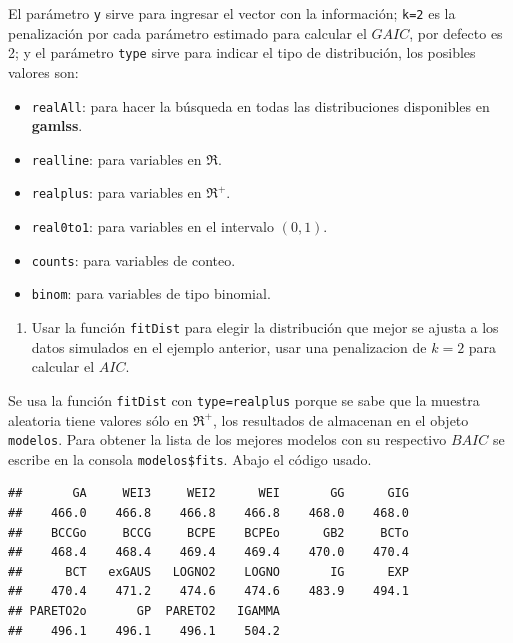 \documentclass[10pt,]{krantz}
\makeatletter
\newenvironment{Shaded}{\begin{snugshade}}{\end{snugshade}}
\newcommand{\KeywordTok}[1]{\textcolor[rgb]{0.13,0.29,0.53}{\textbf{#1}}}
\newcommand{\DataTypeTok}[1]{\textcolor[rgb]{0.13,0.29,0.53}{#1}}
\newcommand{\DecValTok}[1]{\textcolor[rgb]{0.00,0.00,0.81}{#1}}
\newcommand{\StringTok}[1]{\textcolor[rgb]{0.31,0.60,0.02}{#1}}
\newcommand{\OperatorTok}[1]{\textcolor[rgb]{0.81,0.36,0.00}{\textbf{#1}}}
\newcommand{\NormalTok}[1]{#1}
\providecommand{\tightlist}{%
  \setlength{\itemsep}{0pt}\setlength{\parskip}{0pt}}
\newenvironment{kframe}{%
\medskip{}
\setlength{\fboxsep}{.8em}
 \def\at@end@of@kframe{}%
 \ifinner\ifhmode%
  \def\at@end@of@kframe{\end{minipage}}%
  \begin{minipage}{\columnwidth}%
 \fi\fi%
 \def\FrameCommand##1{\hskip\@totalleftmargin \hskip-\fboxsep
 \colorbox{shadecolor}{##1}\hskip-\fboxsep
     \hskip-\linewidth \hskip-\@totalleftmargin \hskip\columnwidth}%
 \MakeFramed {\advance\hsize-\width
   \@totalleftmargin\z@ \linewidth\hsize
   \@setminipage}}%
 {\par\unskip\endMakeFramed%
 \at@end@of@kframe}
\renewenvironment{Shaded}{\begin{kframe}}{\end{kframe}}
\makeatother
\begin{document}
El parámetro \texttt{y} sirve para ingresar el vector con la
información; \texttt{k=2} es la penalización por cada parámetro estimado
para calcular el \(GAIC\), por defecto es 2; y el parámetro
\texttt{type} sirve para indicar el tipo de distribución, los posibles
valores son:

\begin{itemize}
\tightlist
\item
  \texttt{realAll}: para hacer la búsqueda en todas las distribuciones
  disponibles en \textbf{gamlss}.
\item
  \texttt{realline}: para variables en \(\Re\).
\item
  \texttt{realplus}: para variables en \(\Re^+\).
\item
  \texttt{real0to1}: para variables en el intervalo \((0, 1)\).
\item
  \texttt{counts}: para variables de conteo.
\item
  \texttt{binom}: para variables de tipo binomial.
\end{itemize}

\begin{enumerate}
\def\labelenumi{\arabic{enumi})}
\tightlist
\item
  Usar la función \texttt{fitDist} para elegir la distribución que mejor
  se ajusta a los datos simulados en el ejemplo anterior, usar una
  penalizacion de \(k=2\) para calcular el \(AIC\).
\end{enumerate}

Se usa la función \texttt{fitDist} con
\texttt{type=\textquotesingle{}realplus\textquotesingle{}} porque se
sabe que la muestra aleatoria tiene valores sólo en \(\Re^+\), los
resultados de almacenan en el objeto \texttt{modelos}. Para obtener la
lista de los mejores modelos con su respectivo \(BAIC\) se escribe en la
consola \texttt{modelos\$fits}. Abajo el código usado.

\begin{Shaded}
\end{Shaded}

\begin{verbatim}
##       GA     WEI3     WEI2      WEI       GG      GIG 
##    466.0    466.8    466.8    466.8    468.0    468.0 
##    BCCGo     BCCG     BCPE    BCPEo      GB2     BCTo 
##    468.4    468.4    469.4    469.4    470.0    470.4 
##      BCT   exGAUS   LOGNO2    LOGNO       IG      EXP 
##    470.4    471.2    474.6    474.6    483.9    494.1 
## PARETO2o       GP  PARETO2   IGAMMA 
##    496.1    496.1    496.1    504.2
\end{verbatim}
\end{document}

